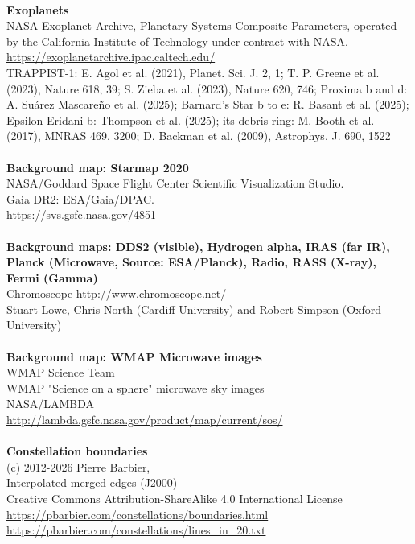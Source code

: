 \documentclass[Orbiter User Manual.tex]{subfiles}
\begin{document}
\\
\textbf{Exoplanets}\\
NASA Exoplanet Archive, Planetary Systems Composite Parameters, operated by the California Institute of Technology under contract with NASA. \url{https://exoplanetarchive.ipac.caltech.edu/}\\
TRAPPIST-1: E. Agol et al. (2021), Planet. Sci. J. 2, 1; T. P. Greene et al. (2023), Nature 618, 39; S. Zieba et al. (2023), Nature 620, 746; Proxima b and d: A. Su\'arez Mascare\~no et al. (2025); Barnard's Star b to e: R. Basant et al. (2025); Epsilon Eridani b: Thompson et al. (2025); its debris ring: M. Booth et al. (2017), MNRAS 469, 3200; D. Backman et al. (2009), Astrophys. J. 690, 1522\\
\\
\textbf{Background map: Starmap 2020}\\
NASA/Goddard Space Flight Center Scientific Visualization Studio.\\
Gaia DR2: ESA/Gaia/DPAC.\\
\url{https://svs.gsfc.nasa.gov/4851}\\
\\
\textbf{Background maps: DDS2 (visible), Hydrogen alpha, IRAS (far IR), Planck (Microwave, Source: ESA/Planck), Radio, RASS (X-ray), Fermi (Gamma)}\\
Chromoscope \url{http://www.chromoscope.net/}\\
Stuart Lowe, Chris North (Cardiff University) and Robert Simpson (Oxford University)\\
\\
\textbf{Background map: WMAP Microwave images}\\
WMAP Science Team\\
WMAP "Science on a sphere" microwave sky images\\
NASA/LAMBDA\\
\url{http://lambda.gsfc.nasa.gov/product/map/current/sos/}\\
\\
\textbf{Constellation boundaries}\\
(c) 2012-2026 Pierre Barbier,\\
Interpolated merged edges (J2000)\\
Creative Commons Attribution-ShareAlike 4.0 International License\\
\url{https://pbarbier.com/constellations/boundaries.html}\\
\url{https://pbarbier.com/constellations/lines_in_20.txt}\\
\end{document}
